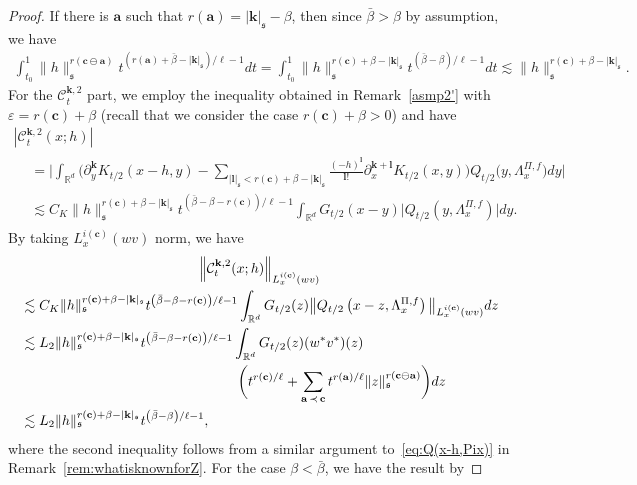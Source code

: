 \documentclass[AHL,Unicode,longabstracts,published]{cedram}
\newcommand{\bbR}{\mathbb{R}}
\newcommand{\mfs}{\mathfrak{s}}
\newcommand{\wco}{w^*}
\newcommand{\vco}{v^*}
\newcommand{\bfa}{\mathbf{a}}
\newcommand{\bfc}{\mathbf{c}}
\newcommand{\bfcoa}{\mathbf{c}\ominus\mathbf{a}}
\newcommand{\bfk}{\mathbf{k}}
\newcommand{\bfl}{\mathbf{l}}
\newcommand{\mcC}{\mathcal{C}}
\begin{document}
\begin{proof}
If there is $\bfa$ such that $r(\bfa)=|{\bfk}|_\mfs-\beta$, then since $\bar\beta>\beta$ by assumption, we have
\begin{align*}
\int_{t_0}^1\|h\|_{\mfs}^{r(\bfcoa)}t^{\left(r(\bfa)+\bar\beta-|{\bfk}|_{\mfs}\right)/\ell-1}dt =\int_{t_0}^1\|h\|_{\mfs}^{r(\bfc)+\beta-|{\bfk}|_\mfs}t^{(\bar\beta-\beta)/\ell-1}dt
\lesssim\|h\|_\mfs^{r(\bfc)+\beta-|{\bfk}|_\mfs}.
\end{align*}
For the $\mcC_t^{{\bfk},2}$ part, we employ the inequality obtained in Remark~\ref{asmp2'} with $\varepsilon=r(\bfc)+\beta$ (recall that we consider the case $r(\bfc)+\beta>0$) and have
\begin{multline}\label{ex:Ck2}
\left|\mcC_t^{{\bfk},2}(x;h)\right|\\
\begin{aligned}
&=\bigg|\int_{\bbR^d}\bigg(\partial_y^{\bfk}K_{t/2}(x-h,y)-\sum_{|{\bfl}|_\mfs<r(\bfc)+\beta-|{\bfk}|_\mfs}\frac{(-h)^{\bfl}}{{\bfl}!}\partial_x^{{\bfk}+{\bfl}}K_{t/2}(x,y)\bigg) Q_{t/2}\big(y,\Lambda_x^{\Pi,f}\big)dy\bigg|\\
&\lesssim C_K\|h\|_\mfs^{r(\bfc)+\beta-|{\bfk}|_\mfs}t^{\left(\bar\beta-\beta-r(\bfc)\right)/\ell-1}\int_{\bbR^d}G_{t/2}(x-y)\big|Q_{t/2}\left(y,\Lambda_x^{\Pi,f}\right)\big|dy.
\end{aligned}
\end{multline}
By taking $L_x^{i(\bfc)}(wv)$ norm, we have
\begin{multline*}
\left\|\mcC_t^{{\bfk},2}(x;h)\right\|_{L_x^{i(\bfc)}(wv)}\\
\begin{aligned}
&\lesssim C_K\|h\|_\mfs^{r(\bfc)+\beta-|{\bfk}|_\mfs}t^{\left(\bar\beta-\beta-r(\bfc)\right)/\ell-1}
\int_{\bbR^d}G_{t/2}(z)\big\|Q_{t/2}\left(x-z,\Lambda_x^{\Pi,f}\right)\big\|_{L_x^{i(\bfc)}(wv)}dz
\\
&\lesssim L_2\|h\|_\mfs^{r(\bfc)+\beta-|{\bfk}|_\mfs}t^{\left(\bar\beta-\beta-r(\bfc)\right)/\ell-1}\int_{\bbR^d}G_{t/2}(z)(\wco\vco)(z)\\
&\mkern280mu\bigg(t^{r(\bfc)/\ell}+\sum_{\bfa\,\prec \,\bfc}t^{r(\bfa)/\ell}\|z\|_{\mfs}^{r(\bfcoa)}\bigg)dz\\
&\lesssim L_2\|h\|_\mfs^{r(\bfc)+\beta-|{\bfk}|_\mfs}t^{\left(\bar\beta-\beta\right)/\ell-1},
\end{aligned}
\end{multline*}
where the second inequality follows from a similar argument to~\eqref{eq:Q(x-h,Pix)} in Remark~\ref{rem:whatisknownforZ}. For the case $\beta<\bar\beta$, we have the result by

\end{proof}
\end{document}

